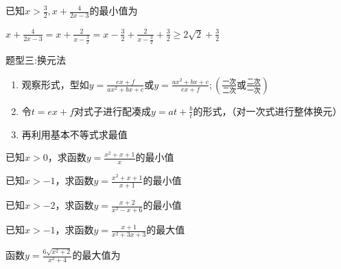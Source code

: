 \documentclass[11pt,a4paper]{ctexbook}
\begin{document}
\par
\begin{problem}
    已知$\displaystyle x>\frac{3}{2},x+\frac{4}{2x-3}$的最小值为
    \begin{jiexi}
        $\displaystyle x+\frac{4}{2x-3}=x+\frac{2}{x-\frac{3}{2}}=x-\frac{3}{2}+\frac{2}{x-\frac{3}{2}}+\frac{3}{2}\ge2\sqrt{2}+\frac{3}{2}$
    \end{jiexi}
\end{problem}

\begin{tcolorbox} 
    \centering
    题型三:换元法
    \tcblower %
    \begin{enumerate}
        \item 观察形式，型如$\displaystyle y=\frac{ex+f}{ax^2+bx+c}$或$\displaystyle y=\frac{ax^2+bx+c}{ex+f};(\frac{\text{一次}}{\text{二次}}\text{或}\frac{\text{二次}}{\text{一次}})$
        \item 令$t=ex+f$对式子进行配凑成$\displaystyle y=at+\frac{b}{t}$的形式，（对一次式进行整体换元）
        \item 再利用基本不等式求最值
    \end{enumerate}
\end{tcolorbox}


\par
\begin{problem}
    已知$x>0$，求函数$\displaystyle y=\frac{x^2+x+1}{x}$的最小值
\end{problem}

\par
\begin{problem}
    已知$x>-1$，求函数$\displaystyle y=\frac{x^2+x+1}{x+1}$的最小值
\end{problem}

\par
\begin{problem}
    已知$x>-2$，求函数$\displaystyle y=\frac{x+2}{x^2-x+6}$的最小值
\end{problem}

\par
\begin{problem}
    已知$x>-1$，求函数$\displaystyle y=\frac{x+1}{x^2+3x+3}$的最大值
\end{problem}

\par
\begin{problem}
    函数$\displaystyle y=\frac{6\sqrt{x^2+2}}{x^2+4}$的最大值为
\end{problem}
\end{document}
